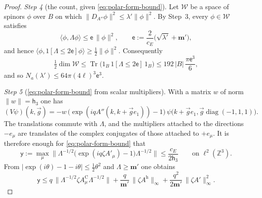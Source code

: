 \documentclass[11pt]{amsart}
\theoremstyle{definition}
\begin{document}
\begin{proof}
\emph{Step 4} (the count, given \eqref{eq:polar-form-bound}).
Let $\mathcal W$ be a space of spinors $\phi$ over $B$ on which $\|D_{A''}\phi\|^2\le\lambda'\|\phi\|^2$.
By Step~3, every $\phi\in\mathcal W$ satisfies
\begin{equation*}
\langle\phi,\Lambda\phi\rangle\le\mathsf e\,\|\phi\|^2,\qquad\mathsf e:=\frac{2}{c_E}\bigl(\sqrt{\lambda'}+\mathbf m'\bigr),
\end{equation*}
and hence $\langle\phi,\allowbreak 1[\Lambda\le2\mathsf e]\phi\rangle\ge\frac12\|\phi\|^2$.
Consequently
\begin{equation*}
\tfrac12\dim\mathcal W\le\operatorname{Tr}\bigl(1_B\,1[\Lambda\le2\mathsf e]\,1_B\bigr)\le192\,|B|\,\frac{\pi\mathsf e^3}{6},
\end{equation*}
and so $N_a(\lambda')\le64\pi(4\ell)^3\mathsf e^3$.

\emph{Step 5} (\eqref{eq:polar-form-bound} from scalar multipliers).
With a matrix $w$ of norm $\|w\|=\mathsf h_3$ \cite[Definition~2.10]{QEDII} one has
\begin{equation*}
(V\psi)(k,\vec g)=-w\,\bigl(\exp(iqA''(k,k+\vec ge_1))-1\bigr)\,\psi\bigl(k+\vec ge_1,\vec g\operatorname{diag}(-1,1,1)\bigr).
\end{equation*}
The translations commute with $\Lambda$, and the multipliers attached to the directions $-e_\mu$ are translates of the complex conjugates of those attached to $+e_\mu$.
It is therefore enough for \eqref{eq:polar-form-bound} that
\begin{equation*}
\mathsf y:=\max_\mu\bigl\|\Lambda^{-1/2}\bigl(\exp(iq\zeta A'_\mu)-1\bigr)\Lambda^{-1/2}\bigr\|\le\frac{c_E}{2\mathsf h_3}\qquad\text{on }\ell^2(\mathbb Z^3).
\end{equation*}
From $|\exp(i\theta)-1-i\theta|\le\frac12\theta^2$ and $\Lambda\ge\mathbf m'$ one obtains
\begin{equation*}
\mathsf y\le q\,\|\Lambda^{-1/2}\zeta A^{\mathrm C}_\mu\Lambda^{-1/2}\|+\frac{q}{\mathbf m'}\,\|\zeta A^{\mathrm h}\|_\infty+\frac{q^2}{2\mathbf m'}\,\|\zeta A'\|^2_\infty.
\end{equation*}


\end{proof}
\end{document}
